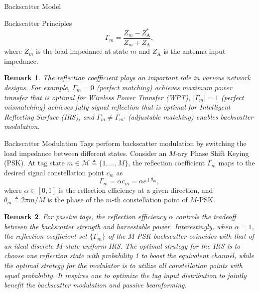 \documentclass[journal]{IEEEtran}
\newtheorem{remark}{Remark}
\begin{document}
\begin{section}{Backscatter Model}
\begin{subsection}{Backscatter Principles}
			\begin{equation}
				\Gamma_m = \frac{Z_m - Z_{\mathrm{A}}^*}{Z_m + Z_{\mathrm{A}}},
				\label{eq:reflection_coefficient}
			\end{equation}
			where $Z_m$ is the load impedance at state $m$ and $Z_{\mathrm{A}}$ is the antenna input impedance.
			\begin{remark}
				The reflection coefficient plays an important role in various network designs. For example, $\Gamma_m = 0$ (perfect matching) achieves maximum power transfer that is optimal for Wireless Power Transfer (WPT), $\lvert \Gamma_m \rvert = 1$ (perfect mismatching) achieves fully signal reflection that is optimal for Intelligent Reflecting Surface (IRS), and $\Gamma_m \ne \Gamma_{m'}$ (adjustable matching) enables backscatter modulation.
			\end{remark}
		\end{subsection}

		\begin{subsection}{Backscatter Modulation}
			Tags perform backscatter modulation by switching the load impedance between different states. Consider an $M$-ary Phase Shift Keying (PSK). At tag state $m \in \mathcal{M} \triangleq \{1,\ldots,M\}$, the reflection coefficient $\Gamma_m$ maps to the desired signal constellation point $c_m$ as \cite{Thomas2012a}
			\begin{equation}
				\Gamma_m = \alpha c_m = \alpha e^{\jmath \theta_m},
				\label{eq:backscatter_modulation}
			\end{equation}
			where $\alpha \in [0,1]$ is the reflection efficiency at a given direction, and $\theta_m \triangleq 2 \pi m / M$ is the phase of the $m$-th constellation point of $M$-PSK.
			\begin{remark}
				For passive tags, the reflection efficiency $\alpha$ controls the tradeoff between the backscatter strength and harvestable power. Interestingly, when $\alpha = 1$, the reflection coefficient set $\{\Gamma_m\}$ of the $M$-PSK backscatter coincides with that of an ideal discrete $M$-state uniform IRS. The optimal strategy for the IRS is to choose one reflection state with probability \num{1} to boost the equivalent channel, while the optimal strategy for the modulator is to utilize all constellation points with equal probability. It inspires one to optimize the tag input distribution to jointly benefit the backscatter modulation and passive beamforming.
			\end{remark}
		\end{subsection}
	\end{section}
\end{document}
